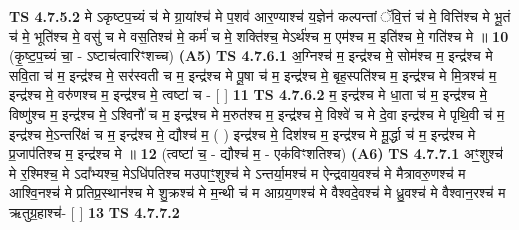 \documentclass[17pt]{extarticle}
\begin{document}
                  \newline
                                \textbf{ TS 4.7.5.2} \newline
                  मे ऽकृष्टप॒च्यं च॑ मे ग्रा॒यांश्च॑ मे प॒शव॑ आर॒ण्याश्च॑ य॒ज्ञेन॑ कल्पन्तां ॅवि॒त्तं च॑ मे॒ वित्ति॑श्च मे भू॒तं च॑ मे॒ भूति॑श्च मे॒ वसु॑ च मे वस॒तिश्च॑ मे॒ कर्म॑ च मे॒ शक्ति॑श्च॒ मेऽर्थ॑श्च म॒ एम॑श्च म॒ इति॑श्च मे॒ गति॑श्च मे ॥ \textbf{  10} \newline
                  \newline
                      (कृ॒ष्ट॒प॒च्यं चा॒ - ऽष्टाच॑त्वारिꣳशच्च)  \textbf{(A5)} \newline \newline
                                        \textbf{ TS 4.7.6.1} \newline
                  अ॒ग्निश्च॑ म॒ इन्द्र॑श्च मे॒ सोम॑श्च म॒ इन्द्र॑श्च मे सवि॒ता च॑ म॒ इन्द्र॑श्च मे॒ सर॑स्वती च म॒ इन्द्र॑श्च मे पू॒षा च॑ म॒ इन्द्र॑श्च मे॒ बृह॒स्पति॑श्च म॒ इन्द्र॑श्च मे मि॒त्रश्च॑ म॒ इन्द्र॑श्च मे॒ वरु॑णश्च म॒ इन्द्र॑श्च मे॒ त्वष्टा॑ च - [  ] \textbf{  11} \newline
                  \newline
                                \textbf{ TS 4.7.6.2} \newline
                  म॒ इन्द्र॑श्च मे धा॒ता च॑ म॒ इन्द्र॑श्च मे॒ विष्णु॑श्च म॒ इन्द्र॑श्च मे॒ ऽश्विनौ॑ च म॒ इन्द्र॑श्च मे म॒रुत॑श्च म॒ इन्द्र॑श्च मे॒ विश्वे॑ च मे दे॒वा इन्द्र॑श्च मे   पृथि॒वी च॑ म॒ इन्द्र॑श्च मे॒ऽन्तरि॑क्षं च म॒ इन्द्र॑श्च मे॒ द्यौश्च॑ म॒ ( ) इन्द्र॑श्च मे॒ दिश॑श्च म॒ इन्द्र॑श्च मे                मू॒र्द्धा च॑ म॒ इन्द्र॑श्च मे प्र॒जाप॑तिश्च म॒ इन्द्र॑श्च मे ॥ \textbf{  12 } \newline
                  \newline
                      (त्वष्टा॑ च॒ - द्यौश्च॑ म॒ - एक॑विꣳशतिश्च)  \textbf{(A6)} \newline \newline
                                        \textbf{ TS 4.7.7.1} \newline
                  अꣳ॒॒शुश्च॑ मे र॒श्मिश्च॒ मे ऽदा᳚भ्यश्च॒ मेऽधि॑पतिश्च मउपाꣳ॒॒शुश्च॑ मे ऽन्तर्या॒मश्च॑ म ऐन्द्रवाय॒वश्च॑ मे मैत्रावरु॒णश्च॑ म आश्वि॒नश्च॑ मे प्रतिप्र॒स्थान॑श्च मे शु॒क्रश्च॑ मे म॒न्थी च॑ म आग्रय॒णश्च॑ मे वैश्वदे॒वश्च॑ मे ध्रु॒वश्च॑ मे वैश्वान॒रश्च॑ म ऋतुग्र॒हाश्च॑- [  ] \textbf{  13} \newline
                  \newline
                                \textbf{ TS 4.7.7.2} \newline
\end{document}

